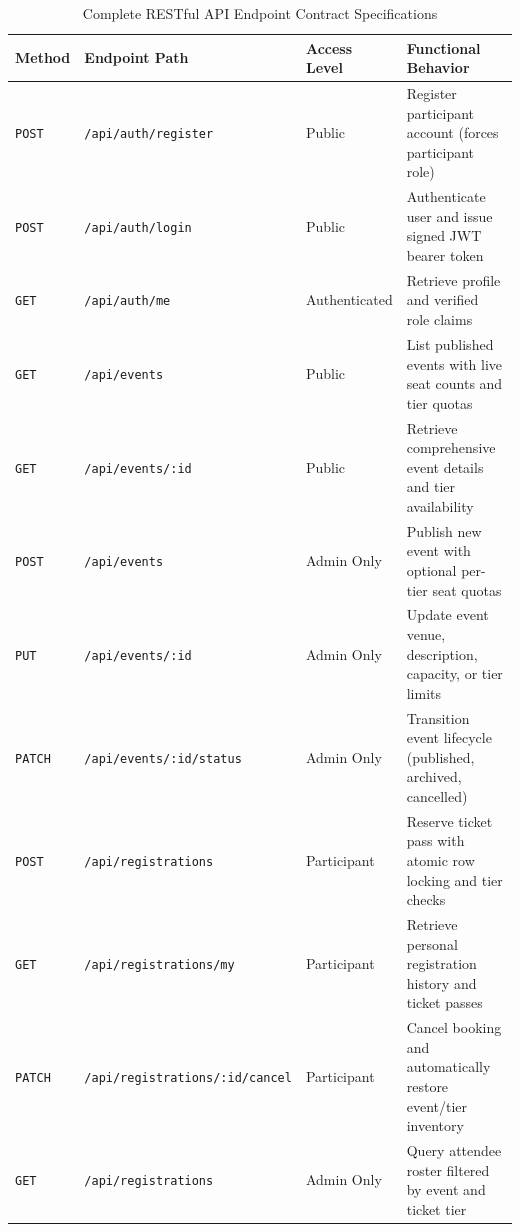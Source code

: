\documentclass[11pt,a4paper]{report}
\begin{document}
\begin{table}[H]
\centering
\fontsize{8}{10.5}\selectfont
\renewcommand{\arraystretch}{1.25}
\setlength{\tabcolsep}{3pt}
\caption{Complete RESTful API Endpoint Contract Specifications}
\label{tab:api_endpoints}
\begin{tabularx}{\textwidth}{|p{}|p{}|p{}|X|}
\hline
\rowcolor{TCSBlue}
\color{white}\bfseries Method & 
\color{white}\bfseries Endpoint Path & 
\color{white}\bfseries Access Level & 
\color{white}\bfseries Functional Behavior \\\hline

\texttt{POST} & \texttt{/api/auth/register} & Public & Register participant account (forces participant role) \\\hline
\texttt{POST} & \texttt{/api/auth/login} & Public & Authenticate user and issue signed JWT bearer token \\\hline
\texttt{GET} & \texttt{/api/auth/me} & Authenticated & Retrieve profile and verified role claims \\\hline
\texttt{GET} & \texttt{/api/events} & Public & List published events with live seat counts and tier quotas \\\hline
\texttt{GET} & \texttt{/api/events/:id} & Public & Retrieve comprehensive event details and tier availability \\\hline
\texttt{POST} & \texttt{/api/events} & Admin Only & Publish new event with optional per-tier seat quotas \\\hline
\texttt{PUT} & \texttt{/api/events/:id} & Admin Only & Update event venue, description, capacity, or tier limits \\\hline
\texttt{PATCH} & \texttt{/api/events/:id/status} & Admin Only & Transition event lifecycle (published, archived, cancelled) \\\hline
\texttt{POST} & \texttt{/api/registrations} & Participant & Reserve ticket pass with atomic row locking and tier checks \\\hline
\texttt{GET} & \texttt{/api/registrations/my} & Participant & Retrieve personal registration history and ticket passes \\\hline
\texttt{PATCH} & \texttt{/api/registrations/:id/cancel} & Participant & Cancel booking and automatically restore event/tier inventory \\\hline
\texttt{GET} & \texttt{/api/registrations} & Admin Only & Query attendee roster filtered by event and ticket tier \\\hline

\end{tabularx}
\end{table}
\end{document}
